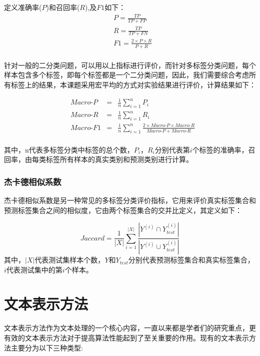 定义准确率($P$)和召回率($R$),及$F1$如下：
\begin{equation}
    \begin{aligned}
        &P=\frac{TP}{TP+FP}\\
        &R=\frac{TP}{TP+FN}\\
        &F1=\frac{2\times P \times R}{P+R}\\
    \end{aligned}
\end{equation}

针对一般的二分类问题，可以用以上指标进行评价，而针对多标签分类问题，每个样本包含多个标签，即每个标签都是一个二分类问题，因此，我们需要综合考虑所有标签上的结果，本课题采用宏平均的方式对实验结果进行评价，计算结果如下：

\begin{equation}
    \begin{aligned}
        & Macro\textrm{-}P &=& \frac{1}{n}\sum_{i=1}^{n}P_{i} \\
        & Macro\textrm{-}R &=& \frac{1}{n}\sum_{i=1}^{n}R_{i} \\
        & Macro\textrm{-}F1 &=& \frac{1}{n}\sum_{i=1}^{n}\frac{2\times Macro\textrm{-}P \times Macro\textrm{-}R}{Macro\textrm{-}P+Macro\textrm{-}R} \\
    \end{aligned}
\end{equation}

其中，n代表多标签分类中标签的总个数，$P_i$，$R_i$分别代表第$i$个标签的准确率，召回率，由每类标签所有样本的真实类别和预测类别进行计算。
\subsubsection{杰卡德相似系数}
杰卡德相似系数是另一种常见的多标签分类评价指标，它用来评价真实标签集合和预测标签集合之间的相似度，它由两个标签集合的交并比定义，其定义如下：

\begin{equation*}
Jaccard =\frac{1}{|X|}\sum_{i=1}^{|X|} \frac{ | Y^{(i)} \cap Y_{test}^{(i)} | } {|Y^{(i)} \cup Y_{test}^{(i)}|}
\end{equation*}
其中，$|X|$代表测试集样本个数，$Y$和$Y_{test}$分别代表预测标签集合和真实标签集合，$i$代表测试集中的第$i$个样本。

\section{文本表示方法}
文本表示方法作为文本处理的一个核心内容，一直以来都是学者们的研究重点，更有效的文本表示方法对于提高算法性能起到了至关重要的作用。现有的文本表示方法主要分为以下三种类型:
